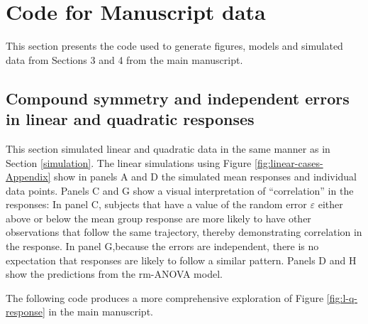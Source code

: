 \documentclass[
]{article}
\begin{document}
\hypertarget{appendix-appendix}{%
\appendix}


\hypertarget{code-for-manuscript-data}{%
\section{Code for Manuscript data}\label{code-for-manuscript-data}}

This section presents the code used to generate figures, models and simulated data from Sections 3 and 4 from the main manuscript.

\hypertarget{compound-symmetry-and-independent-errors-in-linear-and-quadratic-responses}{%
\subsection{Compound symmetry and independent errors in linear and quadratic responses}\label{compound-symmetry-and-independent-errors-in-linear-and-quadratic-responses}}

This section simulated linear and quadratic data in the same manner as in Section \ref{simulation}. The linear simulations using Figure \ref{fig:linear-cases-Appendix} show in panels A and D the simulated mean responses and individual data points. Panels C and G show a visual interpretation of ``correlation'' in the responses: In panel C, subjects that have a value of the random error \(\varepsilon\) either above or below the mean group response are more likely to have other observations that follow the same trajectory, thereby demonstrating correlation in the response. In panel G,because the errors are independent, there is no expectation that responses are likely to follow a similar pattern. Panels D and H show the predictions from the rm-ANOVA model.

The following code produces a more comprehensive exploration of Figure \ref{fig:l-q-response} in the main manuscript.
\end{document}
